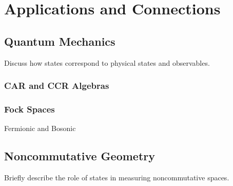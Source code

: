 \section{Applications and Connections}
\subsection{Quantum Mechanics}
Discuss how states correspond to physical states and observables.

\subsubsection{CAR and CCR Algebras}

\subsubsection{Fock Spaces}
Fermionic and Bosonic
\subsection{Noncommutative Geometry}
Briefly describe the role of states in measuring noncommutative spaces.